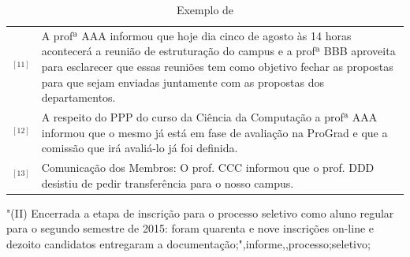 \begin{table}[!h]
	\centering 
\footnotesize
	\begin{tabular}{|p{0.2cm}p{}|} \hline

		$^{[11]}$&A profª AAA informou que hoje dia cinco de agosto às 14 horas acontecerá a reunião de estruturação do campus e a profª BBB aproveita para esclarecer que essas reuniões tem como objetivo fechar as propostas para que sejam enviadas juntamente com as propostas dos departamentos.
 \\

		$^{[12]}$ &
		A respeito do PPP do curso da Ciência da Computação a profª AAA informou que o mesmo já está em fase de avaliação na ProGrad e que a comissão que irá avaliá-lo já foi definida.\\

		$^{[13]}$ &
		Comunicação dos Membros: O prof. CCC informou que o prof. DDD desistiu de pedir transferência para o nosso campus. 

	\end{tabular}
	\caption{Exemplo de }
	\label{tab:segmentacaoreferencia}
\end{table}










"(II) Encerrada a etapa de inscrição para o processo seletivo como aluno regular para o segundo semestre de 2015: foram quarenta e nove inscrições on-line e dezoito candidatos entregaram a documentação;",informe,,processo;seletivo;

